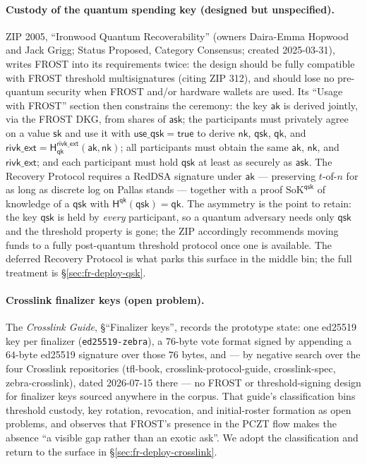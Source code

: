 \documentclass[11pt,a4paper]{article}
\theoremstyle{definition}
\newcommand{\ask}{\ensuremath{\mathsf{ask}}}
\newcommand{\aksym}{\ensuremath{\mathsf{ak}}}
\newcommand{\nksym}{\ensuremath{\mathsf{nk}}}
\begin{document}
\paragraph{Custody of the quantum spending key (designed but
unspecified).} ZIP 2005, ``Ironwood Quantum Recoverability'' (owners
Daira-Emma Hopwood and Jack Grigg; Status Proposed, Category Consensus;
created 2025-03-31), writes FROST into its requirements twice: the design
should be fully compatible with FROST threshold multisignatures (citing
ZIP 312), and should lose no pre-quantum security when FROST and/or
hardware wallets are used. Its ``Usage with FROST'' section then
constrains the ceremony: the key $\aksym$ is derived jointly, via
the FROST DKG, from shares of $\ask$; the participants must
privately agree on a value $\mathsf{sk}$ and use it with
$\mathsf{use\_qsk} = \mathsf{true}$ to derive $\nksym$,
$\mathsf{qsk}$, $\mathsf{qk}$, and $\mathsf{rivk\_ext} =
\mathsf{H}^{\mathsf{rivk\_ext}}_{\mathsf{qk}}(\aksym, \nksym)$;
all participants must obtain the same $\aksym$, $\nksym$, and
$\mathsf{rivk\_ext}$; and each participant must hold $\mathsf{qsk}$ at
least as securely as $\ask$. The Recovery Protocol requires a
RedDSA signature under $\aksym$ --- preserving $t$-of-$n$ for as
long as discrete log on Pallas stands --- together with a proof
$\mathrm{SoK}^{\mathsf{qsk}}$ of knowledge of a $\mathsf{qsk}$ with
$\mathsf{H}^{\mathsf{qk}}(\mathsf{qsk}) = \mathsf{qk}$. The asymmetry is
the point to retain: the key $\mathsf{qsk}$ is held by \emph{every}
participant, so a quantum adversary needs only $\mathsf{qsk}$ and the
threshold property is gone; the ZIP accordingly recommends moving funds
to a fully post-quantum threshold protocol once one is available. The
deferred Recovery Protocol is what parks this surface in the middle bin;
the full treatment is \S\ref{sec:fr-deploy-qsk}.

\paragraph{Crosslink finalizer keys (open problem).} The \emph{Crosslink
Guide}, \S``Finalizer keys'', records the prototype state: one ed25519
key per finalizer (\texttt{ed25519-zebra}), a $76$-byte vote format
signed by appending a $64$-byte ed25519 signature over those $76$
bytes, and --- by negative search over the four
Crosslink repositories (tfl-book, crosslink-protocol-guide,
crosslink-spec, zebra-crosslink), dated 2026-07-15 there --- no FROST or
threshold-signing design for finalizer keys sourced anywhere in the
corpus. That guide's classification bins threshold custody, key
rotation, revocation, and initial-roster formation as open problems, and
observes that FROST's presence in the PCZT flow makes the absence ``a
visible gap rather than an exotic ask''. We adopt the classification and
return to the surface in \S\ref{sec:fr-deploy-crosslink}.
\end{document}
